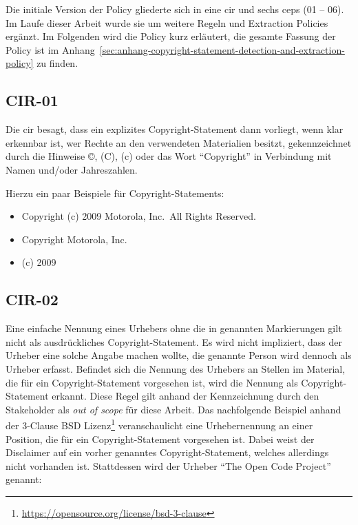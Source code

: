 Die initiale Version der Policy gliederte sich in eine \gls{cir} und sechs \glspl{cep} (01 -- 06).
Im Laufe dieser Arbeit wurde sie um weitere Regeln und Extraction Policies ergänzt.
Im Folgenden wird die Policy kurz erläutert, die gesamte Fassung der Policy ist im Anhang~\ref{sec:anhang-copyright-statement-detection-and-extraction-policy} zu finden.


\subsection{CIR-01}\label{subsec:cir-01}

Die \gls{cir} besagt, dass ein explizites Copyright-Statement dann vorliegt, wenn klar erkennbar ist, wer Rechte an den verwendeten Materialien besitzt, gekennzeichnet durch die Hinweise ©, (C), (c) oder das Wort \enquote{Copyright} in Verbindung mit Namen und/oder Jahreszahlen.

Hierzu ein paar Beispiele für Copyright-Statements:
\begin{itemize}
    \item Copyright (c) 2009 Motorola, Inc.\ All Rights Reserved.
    \item Copyright Motorola, Inc.
    \item (c) 2009
\end{itemize}


\subsection{CIR-02}\label{subsec:cir-02}

Eine einfache Nennung eines Urhebers ohne die in  genannten Markierungen gilt nicht als ausdrückliches Copyright-Statement.
Es wird nicht impliziert, dass der Urheber eine solche Angabe machen wollte, die genannte Person wird dennoch als Urheber erfasst.
Befindet sich die Nennung des Urhebers an Stellen im Material, die für ein Copyright-Statement vorgesehen ist, wird die Nennung als Copyright-Statement erkannt.
Diese Regel gilt anhand der Kennzeichnung durch den Stakeholder als \textit{out of scope} für diese Arbeit.
Das nachfolgende Beispiel anhand der 3-Clause BSD Lizenz\footnote{\url{https://opensource.org/license/bsd-3-clause}} veranschaulicht eine Urhebernennung an einer Position, die für ein Copyright-Statement vorgesehen ist.
Dabei weist der Disclaimer auf ein vorher genanntes Copyright-Statement, welches allerdings nicht vorhanden ist.
Stattdessen wird der Urheber \enquote{The Open Code Project} genannt:

